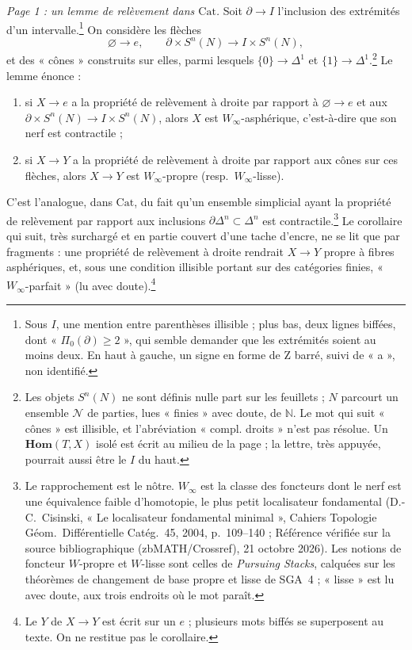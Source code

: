 \documentclass[11pt,a4paper]{article}
\begin{document}
\emph{Page 1 : un lemme de relèvement dans $\mathrm{Cat}$.} Soit
$\partial \to I$ l'inclusion des extrémités d'un intervalle.\footnote{Sous
$I$, une mention entre parenthèses illisible ; plus bas, deux lignes biffées,
dont « $\Pi_0(\partial) \geq 2$ », qui semble demander que les extrémités
soient au moins deux. En haut à gauche, un signe en forme de Z barré, suivi de
« a », non identifié.} On considère les flèches
\[
\varnothing \to e, \qquad \partial \times S^n(N) \longrightarrow I \times S^n(N),
\]
et des « cônes » construits sur elles, parmi lesquels
$\{0\} \to \Delta^1$ et $\{1\} \to \Delta^1$.\footnote{Les objets $S^n(N)$ ne
sont définis nulle part sur les feuillets ; $N$ parcourt un ensemble
$\mathcal N$ de parties, lues « finies » avec doute, de $\mathbb N$. Le mot qui
suit « cônes » est illisible, et l'abréviation « compl. droits » n'est pas
résolue. Un $\mathbf{Hom}(T, X)$ isolé est écrit au milieu de la page ; la
lettre, très appuyée, pourrait aussi être le $I$ du haut.} Le lemme énonce :
\begin{enumerate}
\item[a)] si $X \to e$ a la propriété de relèvement à droite par rapport à
$\varnothing \to e$ et aux $\partial \times S^n(N) \to I \times S^n(N)$, alors
$X$ est $W_\infty$-asphérique, c'est-à-dire que son nerf est contractile ;
\item[b)] si $X \to Y$ a la propriété de relèvement à droite par rapport aux
cônes sur ces flèches, alors $X \to Y$ est $W_\infty$-propre (resp.~$W_\infty$-lisse).
\end{enumerate}
C'est l'analogue, dans $\mathrm{Cat}$, du fait qu'un ensemble simplicial ayant
la propriété de relèvement par rapport aux inclusions $\partial\Delta^n \subset
\Delta^n$ est contractile.\footnote{Le rapprochement est le nôtre. $W_\infty$
est la classe des foncteurs dont le nerf est une équivalence faible
d'homotopie, le plus petit localisateur fondamental (D.-C.~Cisinski, « Le localisateur fondamental minimal », Cahiers Topologie Géom.\ Différentielle Catég.\ 45, 2004, p.~109--140 ; Référence vérifiée sur la source bibliographique (zbMATH/Crossref), 21 octobre 2026). Les notions de foncteur $W$-propre et $W$-lisse sont celles de
\emph{Pursuing Stacks}, calquées sur les théorèmes de changement de base
propre et lisse de SGA~4 ; « lisse » est lu avec doute, aux trois endroits où
le mot paraît.} Le corollaire qui suit, très surchargé et en partie couvert
d'une tache d'encre, ne se lit que par fragments : une propriété de relèvement
à droite rendrait $X \to Y$ propre à fibres asphériques, et, sous une condition
illisible portant sur des catégories finies, « $W_\infty$-parfait » (lu avec
doute).\footnote{Le $Y$ de $X \to Y$ est écrit sur un $e$ ; plusieurs mots
biffés se superposent au texte. On ne restitue pas le corollaire.}
\end{document}
